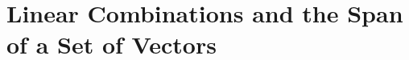 %
%
%

\vfill \pagebreak

\section{Linear Combinations and the Span of a Set of Vectors}
\label{sect:linear:comb:span}

